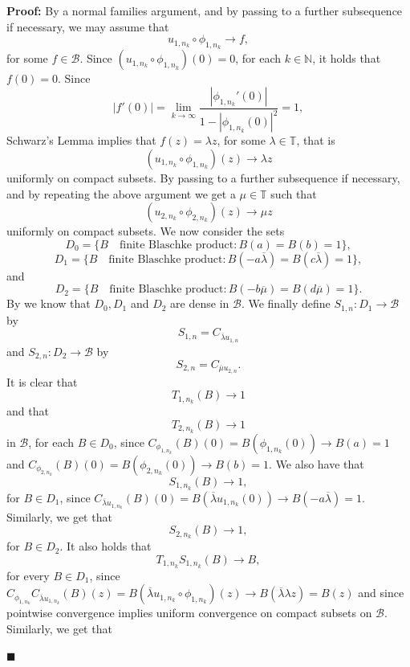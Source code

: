 \documentclass[12pt,a4paper]{amsart}
\theoremstyle{plain}
\theoremstyle{definition}
\theoremstyle{remark}
\theoremstyle{fact}
\newenvironment{pf}
{\noindent\textbf{Proof:}}
{\hfill $\blacksquare$\par\medskip}
\begin{document}
\begin{pf}
        By a normal families argument, and by passing to a further subsequence if necessary, we may assume that
        $$
        u_{1, n_k}\circ \phi_{1, n_k}\rightarrow f,
        $$
        for some $f\in \mathcal{B}$. Since $(u_{1, n_k}\circ \phi_{1, n_k})(0)=0$, for each $k\in \mathbb{N}$, it holds that $f(0)=0$. Since
        $$
        |f'(0)|=\lim_{k\rightarrow \infty}\frac{|\phi_{1, n_k}'(0)|}{1-|\phi_{1, n_k}(0)|^2}=1,
        $$
        Schwarz's Lemma implies that $f(z)=\lambda z$, for some $\lambda \in \mathbb{T}$, that is
        $$
        (u_{1, n_k}\circ \phi_{1, n_k})(z)\rightarrow \lambda z
        $$
        uniformly on compact subsets.
        By passing to a further subsequence if necessary, and by repeating the above argument we get a $\mu \in \mathbb{T}$ such that
        $$
        (u_{2, n_k}\circ \phi_{2, n_k})(z)\rightarrow \mu z
        $$
        uniformly on compact subsets.
        We now consider the sets
        $$
        D_0=\{B \quad \text{finite Blaschke product}: B(a)=B(b)=1\},
        $$
        $$
        D_1=\{B \quad \text{finite Blaschke product}: B(-a\overline{\lambda})=B(c\overline{\lambda})=1\},
        $$
        and
        $$
        D_2=\{B \quad \text{finite Blaschke product}: B(-b\overline{\mu})=B(d\overline{\mu})=1\}.
        $$
        By \cite[Lemma 3.9]{Dave} we know that $D_0, D_1$ and $D_2$ are dense in $\mathcal{B}$. 
        We finally define $S_{1, n}: D_1\rightarrow \mathcal{B}$ by
        $$
        S_{1, n}=C_{\overline{\lambda}u_{1, n}}
        $$
        and $S_{2, n}: D_2\rightarrow \mathcal{B}$ by
        $$
        S_{2, n}=C_{\overline{\mu}u_{2, n}}.
        $$
        It is clear that 
        $$
        T_{1,n_k}(B)\rightarrow 1
        $$ 
        and that 
        $$
        T_{2,n_k}(B)\rightarrow 1$$ 
        in $\mathcal{B}$, for each $B\in D_0$, since $C_{\phi_{1, n_k}}(B)(0)=B(\phi_{1, n_k}(0))\rightarrow B(a)=1$ and $C_{\phi_{2, n_k}}(B)(0)=B(\phi_{2, n_k}(0))\rightarrow B(b)=1$. 
       We also have that 
       $$
       S_{1, n_k}(B)\rightarrow 1,
       $$ 
       for $B\in D_1$, since $C_{\overline{\lambda}u_{1, n_k}}(B)(0)=B(\overline{\lambda}u_{1, n_k}(0))\rightarrow B(-a\overline{\lambda})=1$. Similarly, we get that 
       $$
       S_{2, n_k}(B)\rightarrow 1,
       $$ 
       for $B\in D_2$. 
        It also holds that 
        $$
T_{1, n_k}S_{1, n_k}(B)\rightarrow B,
        $$ 
        for every $B\in D_1$, since $C_{\phi_{1, n_k}}C_{\overline{\lambda}u_{1, n_k}}(B)(z)=B(\overline{\lambda}u_{1, n_k}\circ \phi_{1, n_k})(z)\rightarrow B(\overline{\lambda}\lambda z)= B(z)$ and since pointwise convergence implies uniform convergence on compact subsets on $\mathcal{B}$. Similarly, we get that

\end{pf}
\end{document}
